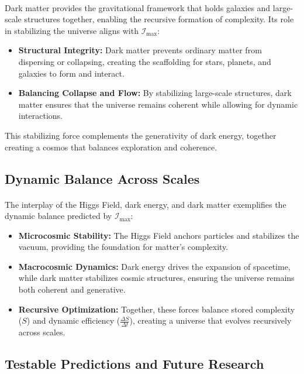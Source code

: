 \documentclass[12pt]{article}
\begin{document}
\paragraph{}
Dark matter provides the gravitational framework that holds galaxies and large-scale structures together, enabling the recursive formation of complexity. Its role in stabilizing the universe aligns with \(\mathcal{I}_{\text{max}}\):
\begin{itemize}
    \item \textbf{Structural Integrity:} Dark matter prevents ordinary matter from dispersing or collapsing, creating the scaffolding for stars, planets, and galaxies to form and interact.
    \item \textbf{Balancing Collapse and Flow:} By stabilizing large-scale structures, dark matter ensures that the universe remains coherent while allowing for dynamic interactions.
\end{itemize}
This stabilizing force complements the generativity of dark energy, together creating a cosmos that balances exploration and coherence.

\subsection{Dynamic Balance Across Scales}
\paragraph{}
The interplay of the Higgs Field, dark energy, and dark matter exemplifies the dynamic balance predicted by \(\mathcal{I}_{\text{max}}\):
\begin{itemize}
    \item \textbf{Microcosmic Stability:} The Higgs Field anchors particles and stabilizes the vacuum, providing the foundation for matter’s complexity.
    \item \textbf{Macrocosmic Dynamics:} Dark energy drives the expansion of spacetime, while dark matter stabilizes cosmic structures, ensuring the universe remains both coherent and generative.
    \item \textbf{Recursive Optimization:} Together, these forces balance stored complexity (\(S\)) and dynamic efficiency (\(\frac{\Delta S}{\Delta t}\)), creating a universe that evolves recursively across scales.
\end{itemize}

\subsection{Testable Predictions and Future Research}
\end{document}
